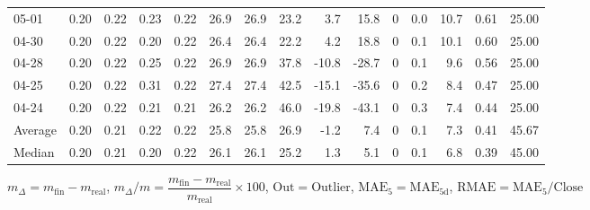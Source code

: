 \begin{threeparttable}
{\begin{tabular}{lrrrrrrrrrrrrrr}
  05-01 &          0.20 &          0.22 &          0.23 &        0.22 &                26.9 &               26.9 &                23.2 &        3.7 &         15.8 &              0 &                 0.0 &             10.7 &            0.61 &                  25.00 \\
  04-30 &          0.20 &          0.22 &          0.20 &        0.22 &                26.4 &               26.4 &                22.2 &        4.2 &         18.8 &              0 &                 0.1 &             10.1 &            0.60 &                  25.00 \\
  04-28 &          0.20 &          0.22 &          0.25 &        0.22 &                26.9 &               26.9 &                37.8 &      -10.8 &        -28.7 &              0 &                 0.1 &              9.6 &            0.56 &                  25.00 \\
  04-25 &          0.20 &          0.22 &          0.31 &        0.22 &                27.4 &               27.4 &                42.5 &      -15.1 &        -35.6 &              0 &                 0.2 &              8.4 &            0.47 &                  25.00 \\
  04-24 &          0.20 &          0.22 &          0.21 &        0.21 &                26.2 &               26.2 &                46.0 &      -19.8 &        -43.1 &              0 &                 0.3 &              7.4 &            0.44 &                  25.00 \\
Average &          0.20 &          0.21 &          0.22 &        0.22 &                25.8 &               25.8 &                26.9 &       -1.2 &          7.4 &              0 &                 0.1 &              7.3 &            0.41 &                  45.67 \\
 Median &          0.20 &          0.21 &          0.20 &        0.22 &                26.1 &               26.1 &                25.2 &        1.3 &          5.1 &              0 &                 0.1 &              6.8 &            0.39 &                  45.00 \\
\bottomrule
\end{tabular}
}
\begin{tablenotes}\footnotesize
\item $m_\Delta=m_{\text{fin}}-m_{\text{real}}$,
$m_\Delta/m=\dfrac{m_{\text{fin}}-m_{\text{real}}}{m_{\text{real}}}\times100$,
$\mathrm{Out}=\text{Outlier}$,
$\mathrm{MAE}_5=\mathrm{MAE}_{5\text{d}}$,
$\mathrm{RMAE}=\mathrm{MAE}_5/\text{Close}$
\end{tablenotes}
\end{threeparttable}
\endgroup

